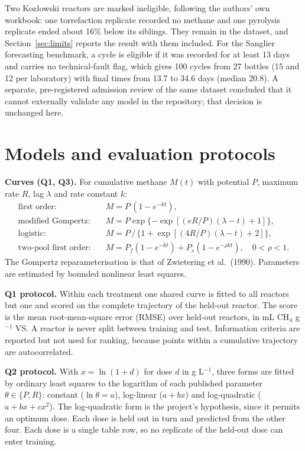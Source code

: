 \documentclass[10pt,a4paper]{article}
\begin{document}
Two Koz\l{}owski reactors are marked ineligible, following the authors' own workbook: one torrefaction replicate recorded no methane and one pyrolysis replicate ended about 16\% below its siblings. They remain in the dataset, and Section~\ref{sec:limits} reports the result with them included. For the Sanglier forecasting benchmark, a cycle is eligible if it was recorded for at least 13 days and carries no technical-fault flag, which gives 100 cycles from 27 bottles (15 and 12 per laboratory) with final times from 13.7 to 34.6 days (median 20.8). A separate, pre-registered admission review of the same dataset concluded that it cannot externally validate any model in the repository; that decision is unchanged here.

\section{Models and evaluation protocols}
\textbf{Curves (Q1, Q3).} For cumulative methane $M(t)$ with potential $P$, maximum rate $R$, lag $\lambda$ and rate constant $k$:
\begin{align*}
\text{first order:}\quad & M = P\,(1-e^{-kt}), \\
\text{modified Gompertz:}\quad & M = P\exp\{-\exp[(eR/P)(\lambda-t)+1]\}, \\
\text{logistic:}\quad & M = P\,/\,\{1+\exp[(4R/P)(\lambda-t)+2]\}, \\
\text{two-pool first order:}\quad & M = P_f(1-e^{-k t}) + P_s(1-e^{-\rho k t}),\quad 0<\rho<1 .
\end{align*}
The Gompertz reparameterisation is that of Zwietering et al.\ (1990). Parameters are estimated by bounded nonlinear least squares.

\textbf{Q1 protocol.} Within each treatment one shared curve is fitted to all reactors but one and scored on the complete trajectory of the held-out reactor. The score is the mean root-mean-square error (RMSE) over held-out reactors, in mL CH$_4$ g$^{-1}$ VS. A reactor is never split between training and test. Information criteria are reported but not used for ranking, because points within a cumulative trajectory are autocorrelated.

\textbf{Q2 protocol.} With $x=\ln(1+d)$ for dose $d$ in g L$^{-1}$, three forms are fitted by ordinary least squares to the logarithm of each published parameter $\theta\in\{P,R\}$: constant ($\ln\theta=a$), log-linear ($a+bx$) and log-quadratic ($a+bx+cx^2$). The log-quadratic form is the project's hypothesis, since it permits an optimum dose. Each dose is held out in turn and predicted from the other four. Each dose is a single table row, so no replicate of the held-out dose can enter training.
\end{document}
